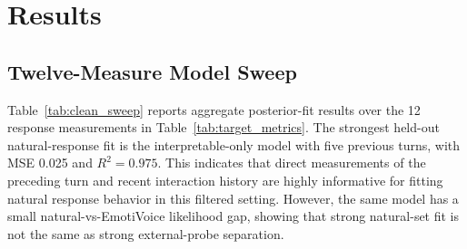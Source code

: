 \documentclass[conference]{IEEEtran}
\begin{document}
\section{Results}
\subsection{Twelve-Measure Model Sweep}
Table~\ref{tab:clean_sweep} reports aggregate posterior-fit results over the 12 response measurements in Table~\ref{tab:target_metrics}.
The strongest held-out natural-response fit is the interpretable-only model with five previous turns, with MSE 0.025 and $R^2=0.975$.
This indicates that direct measurements of the preceding turn and recent interaction history are highly informative for fitting natural response behavior in this filtered setting.
However, the same model has a small natural-vs-EmotiVoice likelihood gap, showing that strong natural-set fit is not the same as strong external-probe separation.
\end{document}
